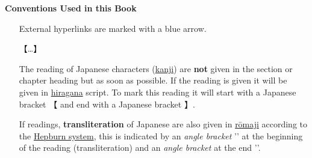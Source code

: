 

\label{para:Conventions}

\bigskip

\textbf{Conventions Used in this Book}

\medskip

\begin{itemize}

    \item[\Link]

        External hyperlinks are marked with a blue arrow.


    \item[{【}\ldots{】}]

        The reading of Japanese characters (\hyperref[sec:Kanji]{kanji}) are
        \textbf{not} given in the section or chapter heading but as soon as
        possible. If the reading is given it will be given in
        \hyperref[sec:Hiragana]{hiragana} script. To mark this reading it will
        start with a Japanese bracket {【} and end with a Japanese bracket
        {】}.


        \medskip

    \item[\jtl{\ldots}]

         If readings, \textbf{transliteration} of Japanese are also given in
         \hyperref[sec:Romaji]{rōmaji} according to the
         \hyperref[sec:Hepburn]{Hepburn system}, this is indicated by an
         \textit{angle bracket} '\textlangle{}' at the beginning of the reading
         (transliteration) and an \textit{angle bracket} at the end
         '\textrangle{}'.


\end{itemize}
